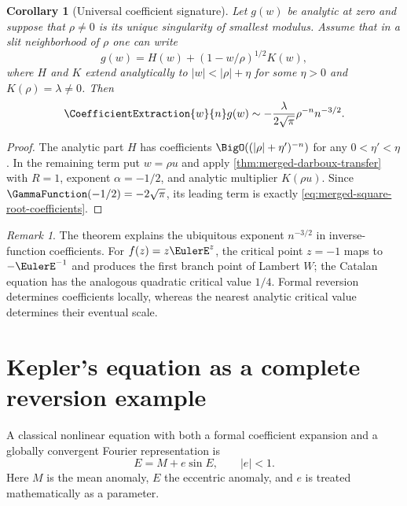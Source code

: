 \documentclass[11pt,a4paper,oneside,openany]{book}
\newtheorem{corollary}[theorem]{Corollary}
\theoremstyle{definition}
\theoremstyle{remark}
\newtheorem{remark}[theorem]{Remark}
\begin{document}
\begin{corollary}[Universal coefficient signature]
\label{cor:merged-square-root-coefficients}
Let $g(w)$ be analytic at zero and suppose that $\rho\ne0$ is its unique
singularity of smallest modulus.  Assume that in a slit neighborhood of $\rho$
one can write
\[
 g(w)=H(w)+(1-w/\rho)^{1/2}K(w),
\]
where $H$ and $K$ extend analytically to $|w|<|\rho|+\eta$ for some $\eta>0$
and $K(\rho)=\lambda\ne0$.  Then
\begin{equation}
 \CoefficientExtraction{w}{n}g(w)\sim-\frac{\lambda}{2\sqrt\pi}\rho^{-n}n^{-3/2}.        \label{eq:merged-square-root-coefficients}
\end{equation}
\end{corollary}

\begin{proof}
The analytic part $H$ has coefficients $\BigO((|\rho|+\eta')^{-n})$ for any
$0<\eta'<\eta$.  In the remaining term put $w=\rho u$ and apply
\cref{thm:merged-darboux-transfer} with $R=1$, exponent
$\alpha=-1/2$, and analytic multiplier $K(\rho u)$.  Since
$\GammaFunction(-1/2)=-2\sqrt\pi$, its leading term is exactly
\cref{eq:merged-square-root-coefficients}.
\end{proof}

\begin{remark}
The theorem explains the ubiquitous exponent $n^{-3/2}$ in inverse-function
coefficients.  For $f(z)=z\EulerE^z$, the critical point $z=-1$ maps to
$-\EulerE^{-1}$ and produces the first branch point of Lambert $W$; the
Catalan equation has the analogous quadratic critical value $1/4$.  Formal
reversion determines coefficients locally, whereas the nearest analytic
critical value determines their eventual scale.
\end{remark}

\chapter{Kepler's equation as a complete reversion example}
\label{ch:merged-kepler}

A classical nonlinear equation with both a formal coefficient expansion and
a globally convergent Fourier representation is
\begin{equation}
 E=M+e\sin E,\qquad |e|<1.                                       \label{eq:merged-kepler}
\end{equation}
Here $M$ is the mean anomaly, $E$ the eccentric anomaly, and $e$ is treated
mathematically as a parameter.
\end{document}
